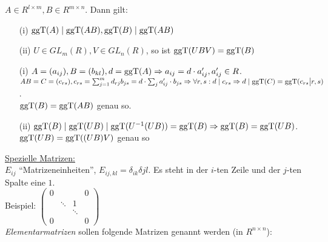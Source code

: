 \documentclass[a4paper,DIV15,BCOR12mm]{article}
\begin{document}
\begin{lemma}
    $A \in R^{l \times m}, B \in R^{m \times n}$. Dann gilt:
    \begin{itemize}
        \item[(i)] $\mathop{\rm ggT}\nolimits(A) \mid \mathop{\rm ggT}\nolimits(AB), \mathop{\rm ggT}\nolimits(B) \mid \mathop{\rm ggT}\nolimits(AB)$
        \item[(ii)] $U \in GL_m(R), V \in GL_n(R)$, so ist $\mathop{\rm ggT}\nolimits(UBV) = \mathop{\rm ggT}\nolimits(B)$
    \end{itemize}
\end{lemma}
\begin{beweis}
    \begin{itemize}
        \item[(i)] $A = (a_{ij}), B = (b_{kl}), d = \mathop{\rm ggT}\nolimits(A) \Rightarrow a_{ij} = d \cdot a_{ij}', a_{ij}' \in R$. $AB = C = (c_{rs}), c_{rs} = \sum_{j = 1}^md_{rj}b_{js} = d \cdot \sum_ja_{ij}'\cdot b_{js} \Rightarrow \forall r,s: d \mid c_{rs} \Rightarrow d \mid \mathop{\rm ggT}\nolimits(C) = \mathop{\rm ggT}\nolimits(c_{rs} \big| r,s)$.\\
            $\mathop{\rm ggT}\nolimits(B) = \mathop{\rm ggT}\nolimits(AB)$ genau so.
        \item[(ii)] $\mathop{\rm ggT}\nolimits(B) \mid \mathop{\rm ggT}\nolimits(UB) \mid \mathop{\rm ggT}\nolimits(U^{-1}(UB)) = \mathop{\rm ggT}\nolimits(B) \Rightarrow \mathop{\rm ggT}\nolimits(B) = \mathop{\rm ggT}\nolimits(UB)$.\\
            $\mathop{\rm ggT}\nolimits(UB) = \mathop{\rm ggT}\nolimits((UB)V)$ genau so
    \end{itemize}
\end{beweis}
\underline{Spezielle Matrizen:}\\
$E_{ij}$ "`Matrizeneinheiten"', $E_{ij,kl} = \delta_{ik}\delta{jl}$. Es steht in der $i$-ten Zeile und der $j$-ten Spalte eine $1$.\\
Beispiel: $\begin{pmatrix}0 & & & 0\\
                            & \ddots & 1 \\
                            & & \ddots & \\
                          0 & & & 0\end{pmatrix}$\\
\emph{Elementarmatrizen} sollen folgende Matrizen genannt werden (in
$R^{n\times n}$):
\end{document}
